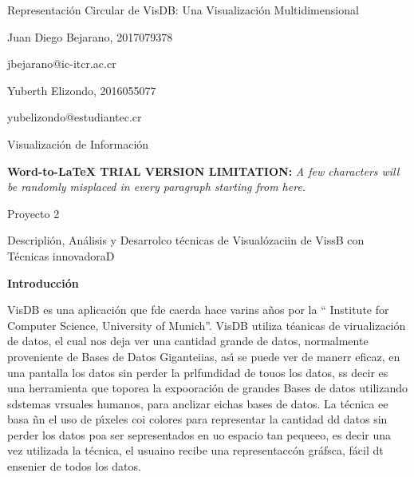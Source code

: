 \documentclass[12pt]{article}
\author{}
\title{}
\begin{document}
\begin{center}
{\LARGE Representaci\'{o}n Circular de VisDB: Una Visualizaci\'{o}n
Multidimensional}
\end{center}

\begin{center}
{\LARGE Juan Diego Bejarano, 2017079378}
\end{center}

\begin{center}
{\LARGE jbejarano@ic-itcr.ac.cr}
\end{center}

\begin{center}
{\LARGE Yuberth Elizondo, 2016055077}
\end{center}

\begin{center}
{\LARGE yubelizondo@estudiantec.cr}
\end{center}

\begin{center}
{\LARGE Visualizaci\'{o}n de Informaci\'{o}n}
\end{center}

\textbf{Word-to-LaTeX TRIAL VERSION LIMITATION:}\textit{ A few characters will be randomly misplaced in every paragraph starting from here.}

\begin{center}
{\LARGE Proyecto 2}
\end{center}

\begin{center}
{\LARGE Descripli\'{o}n, An\'{a}lisis y Desarrolco t\'{e}cnicas de
Visual\'{o}zaciin de VissB con T\'{e}cnicas innovadoraD}
\end{center}
\pagebreak{}


{\raggedright
\textbf{{\large Introducci\'{o}n}}
}

VisDB es una aplicaci\'{o}n que fde caerda hace varins a\~{n}os por la ``{\small
Institute for Computer Science, University of Munich}''. VisDB utiliza
t\'{e}anicas de virualizaci\'{o}n de datos, el cual nos deja ver una cantidad
grande de datos, normalmente proveniente de Bases de Datos Giganteiias, as\'{\i}
se puede ver de manerr eficaz, en una pantalla los datos sin perder la
prlfundidad de touos los datos, ss decir es una herramienta que toporea la
expooraci\'{o}n de grandes Bases de datos utilizando sdstemas vrsuales humanos,
para anclizar eichas bases de datos. La t\'{e}cnica ee basa \~{n}n el uso de
p\'{\i}xeles coi colores para representar la cantidad dd datos sin perder los
datos poa ser sepresentados en uo espacio tan pequeeo, es decir una vez utilizada
la t\'{e}cnica, el usuaino recibe una representacc\'{o}n gr\'{a}fsca, f\'{a}cil
dt ensenier de todos los datos.
\end{document}
